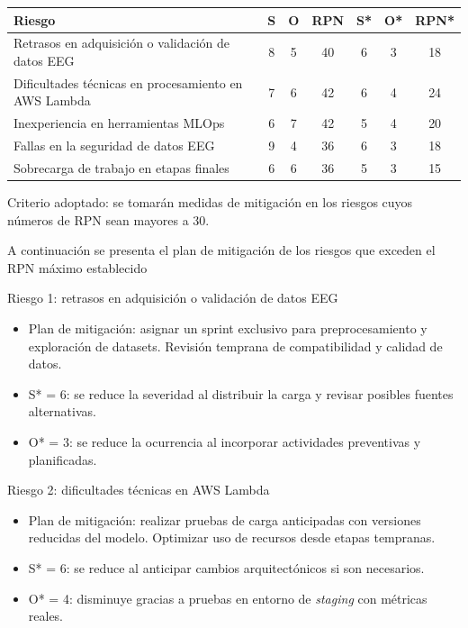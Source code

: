 \documentclass[
11pt, %
]{charter}
\begin{document}
\begin{table}[htpb]
\centering
\begin{tabularx}{\linewidth}{@{}|X|c|c|c|c|c|c|@{}}
\hline
\rowcolor[HTML]{C0C0C0}
\textbf{Riesgo} & \textbf{S} & \textbf{O} & \textbf{RPN} & \textbf{S*} & \textbf{O*} & \textbf{RPN*} \\ \hline
Retrasos en adquisición o validación de datos EEG & 8 & 5 & 40 & 6 & 3 & 18 \\ \hline
Dificultades técnicas en procesamiento en AWS Lambda & 7 & 6 & 42 & 6 & 4 & 24 \\ \hline
Inexperiencia en herramientas MLOps & 6 & 7 & 42 & 5 & 4 & 20 \\ \hline
Fallas en la seguridad de datos EEG & 9 & 4 & 36 & 6 & 3 & 18 \\ \hline
Sobrecarga de trabajo en etapas finales & 6 & 6 & 36 & 5 & 3 & 15 \\ \hline
\end{tabularx}


\end{table}
Criterio adoptado: se tomarán medidas de mitigación en los riesgos cuyos números de RPN sean mayores a 30.

A continuación se presenta el plan de mitigación de los riesgos que exceden el RPN máximo establecido


Riesgo 1: retrasos en adquisición o validación de datos EEG
\begin{itemize}
  \item Plan de mitigación: asignar un sprint exclusivo para preprocesamiento y exploración de datasets. Revisión temprana de compatibilidad y calidad de datos.
  \item S* = 6: se reduce la severidad al distribuir la carga y revisar posibles fuentes alternativas.
  \item O* = 3: se reduce la ocurrencia al incorporar actividades preventivas y planificadas.
\end{itemize}

Riesgo 2: dificultades técnicas en AWS Lambda
\begin{itemize}
  \item Plan de mitigación: realizar pruebas de carga anticipadas con versiones reducidas del modelo. Optimizar uso de recursos desde etapas tempranas.
  \item S* = 6: se reduce al anticipar cambios arquitectónicos si son necesarios.
  \item O* = 4: disminuye gracias a pruebas en entorno de \textit{staging} con métricas reales.
\end{itemize}
\end{document}
